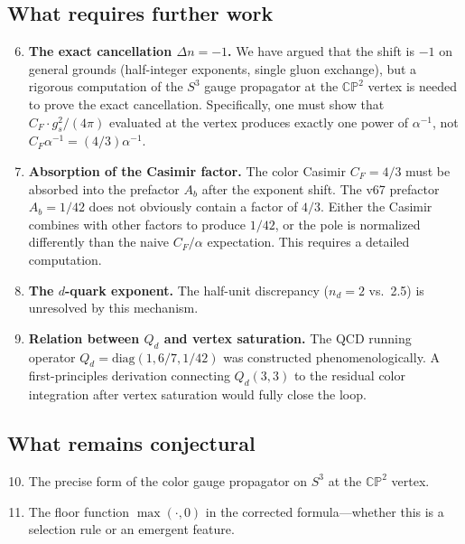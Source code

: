 \documentclass[11pt,a4paper]{article}
\newcommand{\CP}{\mathbb{CP}}
\theoremstyle{definition}
\theoremstyle{remark}
\begin{document}
\subsection{What requires further work}

\begin{enumerate}
\setcounter{enumi}{5}
\item \textbf{The exact cancellation $\Delta n = -1$.}  We have argued that
  the shift is $-1$ on general grounds (half-integer exponents, single gluon
  exchange), but a rigorous computation of the $S^3$ gauge propagator at the
  $\CP^2$ vertex is needed to prove the exact cancellation.  Specifically,
  one must show that $C_F \cdot g_s^2 / (4\pi)$ evaluated at the vertex
  produces exactly one power of $\alpha^{-1}$, not $C_F \alpha^{-1} = (4/3)\alpha^{-1}$.

\item \textbf{Absorption of the Casimir factor.}  The color Casimir $C_F = 4/3$
  must be absorbed into the prefactor $A_b$ after the exponent shift.  The
  v67 prefactor $A_b = 1/42$ does not obviously contain a factor of $4/3$.
  Either the Casimir combines with other factors to produce $1/42$, or the
  pole is normalized differently than the naive $C_F/\alpha$ expectation.
  This requires a detailed computation.

\item \textbf{The $d$-quark exponent.}  The half-unit discrepancy
  ($n_d = 2$ vs.\ 2.5) is unresolved by this mechanism.

\item \textbf{Relation between $Q_d$ and vertex saturation.}  The QCD
  running operator $Q_d = \text{diag}(1, 6/7, 1/42)$ was constructed
  phenomenologically.  A first-principles derivation connecting $Q_d(3,3)$
  to the residual color integration after vertex saturation would fully
  close the loop.
\end{enumerate}

\subsection{What remains conjectural}

\begin{enumerate}
\setcounter{enumi}{9}
\item The precise form of the color gauge propagator on $S^3$ at the $\CP^2$
  vertex.
\item The floor function $\max(\cdot, 0)$ in the corrected formula---whether
  this is a selection rule or an emergent feature.
\end{enumerate}
\end{document}
